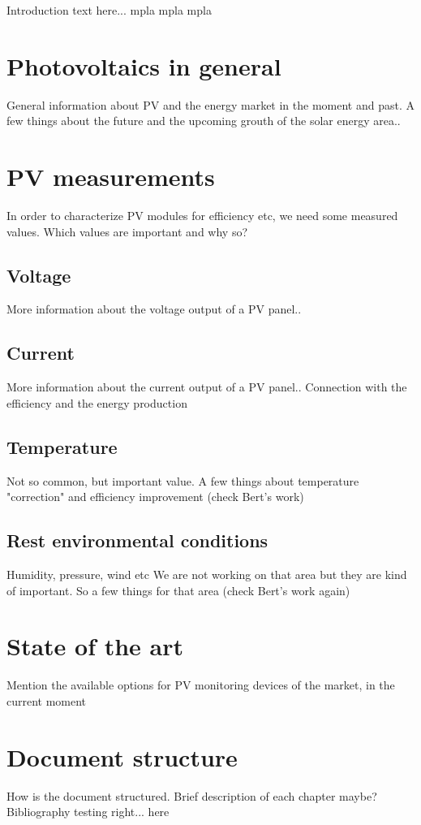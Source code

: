 Introduction text here... mpla mpla mpla

\section{Photovoltaics in general}
General information about PV and the energy market in the moment and past. A few things about the future and the upcoming grouth of the solar energy area..

\section{PV measurements}
In order to characterize PV modules for efficiency etc, we need some measured values. Which values are important and why so?

\subsection{Voltage}
More information about the voltage output of a PV panel..

\subsection{Current}
More information about the current output of a PV panel.. Connection with the efficiency and the energy production

\subsection{Temperature}
Not so common, but important value. A few things about temperature "correction" and efficiency improvement (check Bert's work)

\subsection{Rest environmental conditions}
Humidity, pressure, wind etc
We are not working on that area but they are kind of important. So a few things for that area (check Bert's work again)

\section{State of the art}
Mention the available options for PV monitoring devices of the market, in the current moment

\section{Document structure}
How is the document structured. Brief description of each chapter maybe?\\
Bibliography testing right... here\cite{einstein}